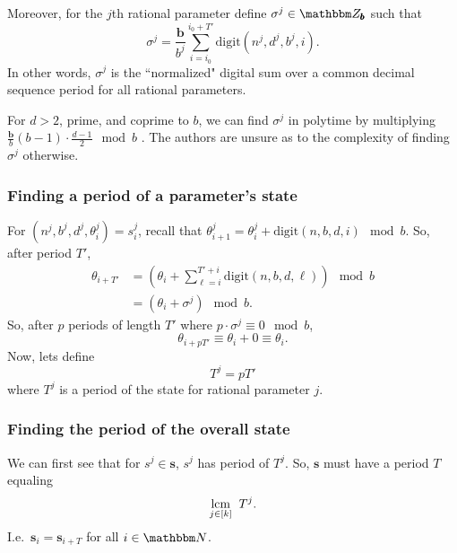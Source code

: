 \documentclass[11pt,titlepage]{article}
\newcommand{\rationalPeriodTotal}{{T}'}
\newcommand{\statePeriod}{T^j}
\newcommand{\rationalAngle}[1]{{\theta^j_{#1}}}
\newcommand{\stateNotime}[1]{s^{#1}}
\newcommand{\totalPeriod}{T}
\newcommand{\commonBase}{{\pmb{b}}}
\newcommand{\numbToCommon}{\frac{\commonBase}{b^j}}
\newcommand{\digSumPeriodic}{\sigma^j}
\begin{document}
Moreover, for the $j$th rational parameter define $\digSumPeriodic \in \Z_{\commonBase}$
such that
\begin{equation}
  \digSumPeriodic = \numbToCommon \sum_{i = i_0}^{i_0 + \rationalPeriodTotal} \mathrm{digit}(n^j, d^j, b^j, i).
\end{equation}
In other words, $\digSumPeriodic$ is the ``normalized" digital sum over 
a common decimal sequence period for all rational parameters.

\begin{remark}[Complexity]
\label{remark:digsum-complexity}
  For $d > 2$, prime, and coprime to $b$, we can find $\digSumPeriodic$
  in polytime by multiplying $\frac{\commonBase}{b}(b - 1) \cdot \frac{d-1}{2} \mod b$ \cite{OnDecSeq}. The authors are unsure
  as to the complexity of finding $\digSumPeriodic$ otherwise.
\end{remark}

\subsubsection{Finding a period of a parameter's state} %
For $(n^j, b^j, d^j, \theta_i^j) = s_i^j$,
recall that $\rationalAngle{i + 1} = \rationalAngle{i} + \mathrm{digit}(n, b, d, i) \mod b$.
So, after period $\rationalPeriodTotal$,
\begin{align*}
  \theta_{i + \rationalPeriodTotal} &= \left(\theta_{i} + \sum_{\ell = i}^{\rationalPeriodTotal + i} \mathrm{digit}(n, b, d, \ell)\right) \mod b\\
  &= \left(\theta_{i} +  \digSumPeriodic\right) \mod b.
\end{align*}
So, after $p$ periods of length $\rationalPeriodTotal$ where $p  \cdot \digSumPeriodic \equiv 0 \mod b$,
$$
\theta_{i + p\rationalPeriodTotal} \equiv \theta_i + 0 \equiv \theta_i.
$$
Now, lets define
$$
  T^j = p\rationalPeriodTotal
$$
where $T^j$ is a period of the state for rational parameter $j$.

\subsubsection{Finding the period of the overall state}
We can first see that for $\stateNotime{j} \in \pmb{s}$, $\stateNotime{j}$
has period of $\statePeriod$. So, $\pmb{s}$ must have a period $\totalPeriod$ equaling
$$
\underset{j \in [k]}{\operatorname{lcm}}\;\; T^j.
$$
I.e.\ $\pmb{s}_i = \pmb{s}_{i + T}$ for all $i \in \N$.
\end{document}
